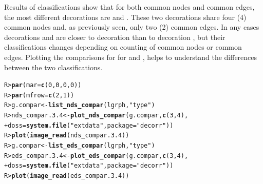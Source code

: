 \documentclass[article]{jss}\usepackage[]{graphicx}\usepackage[]{color}
\makeatletter
\newcommand{\hlnum}[1]{\textcolor[rgb]{0.686,0.059,0.569}{#1}}%
\newcommand{\hlstr}[1]{\textcolor[rgb]{0.192,0.494,0.8}{#1}}%
\newcommand{\hlstd}[1]{\textcolor[rgb]{0.345,0.345,0.345}{#1}}%
\newcommand{\hlkwb}[1]{\textcolor[rgb]{0.69,0.353,0.396}{#1}}%
\newcommand{\hlkwc}[1]{\textcolor[rgb]{0.333,0.667,0.333}{#1}}%
\newcommand{\hlkwd}[1]{\textcolor[rgb]{0.737,0.353,0.396}{\textbf{#1}}}%
\newenvironment{kframe}{%
 \def\at@end@of@kframe{}%
 \ifinner\ifhmode%
  \def\at@end@of@kframe{\end{minipage}}%
  \begin{minipage}{\columnwidth}%
 \fi\fi%
 \def\FrameCommand##1{\hskip\@totalleftmargin \hskip-\fboxsep
 \colorbox{shadecolor}{##1}\hskip-\fboxsep
     \hskip-\linewidth \hskip-\@totalleftmargin \hskip\columnwidth}%
 \MakeFramed {\advance\hsize-\width
   \@totalleftmargin\z@ \linewidth\hsize
   \@setminipage}}%
 {\par\unskip\endMakeFramed%
 \at@end@of@kframe}
\newenvironment{knitrout}{}{} %
\makeatother
\begin{document}
Results of classifications show that for both common nodes and common edges, the most different decorations are  and . These two decorations share four (4) common nodes and, as previously seen, only two (2) common edges.
In any cases decorations  and  are closer to decoration  than to decoration , but their classifications changes depending on counting of common nodes or common edges. Plotting the comparisons for for  and , helps to understand the differences between the two classifications.

\begin{knitrout}
\color{fgcolor}\begin{kframe}
\begin{alltt}
\hlstd{R> }\hlkwd{par}\hlstd{(}\hlkwc{mar}\hlstd{=}\hlkwd{c}\hlstd{(}\hlnum{0}\hlstd{,}\hlnum{0}\hlstd{,}\hlnum{0}\hlstd{,}\hlnum{0}\hlstd{))}
\hlstd{R> }\hlkwd{par}\hlstd{(}\hlkwc{mfrow}\hlstd{=}\hlkwd{c}\hlstd{(}\hlnum{2}\hlstd{,}\hlnum{1}\hlstd{))}
\hlstd{R> }\hlstd{g.compar} \hlkwb{<-} \hlkwd{list_nds_compar}\hlstd{(lgrph,}\hlstr{"type"}\hlstd{)}
\hlstd{R> }\hlstd{nds_compar.3.4} \hlkwb{<-} \hlkwd{plot_nds_compar}\hlstd{(g.compar,} \hlkwd{c}\hlstd{(}\hlnum{3}\hlstd{,}\hlnum{4}\hlstd{),}
\hlstd{+ }                                  \hlkwc{doss} \hlstd{=} \hlkwd{system.file}\hlstd{(}\hlstr{"extdata"}\hlstd{,} \hlkwc{package} \hlstd{=} \hlstr{"decorr"}\hlstd{))}
\hlstd{R> }\hlkwd{plot}\hlstd{(}\hlkwd{image_read}\hlstd{(nds_compar.3.4))}
\hlstd{R> }\hlstd{g.compar} \hlkwb{<-} \hlkwd{list_eds_compar}\hlstd{(lgrph,}\hlstr{"type"}\hlstd{)}
\hlstd{R> }\hlstd{eds_compar.3.4} \hlkwb{<-} \hlkwd{plot_eds_compar}\hlstd{(g.compar,} \hlkwd{c}\hlstd{(}\hlnum{3}\hlstd{,}\hlnum{4}\hlstd{),}
\hlstd{+ }                              \hlkwc{doss} \hlstd{=} \hlkwd{system.file}\hlstd{(}\hlstr{"extdata"}\hlstd{,} \hlkwc{package} \hlstd{=} \hlstr{"decorr"}\hlstd{))}
\hlstd{R> }\hlkwd{plot}\hlstd{(}\hlkwd{image_read}\hlstd{(eds_compar.3.4))}
\end{alltt}
\end{kframe}\begin{figure}[H]


\end{figure}
\end{knitrout}
\end{document}
